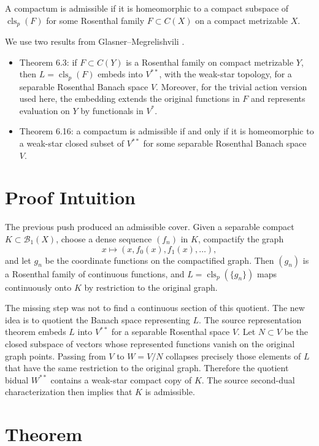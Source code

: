 \documentclass[11pt]{article}
\newcommand{\Baire}{\mathcal B_1}
\newcommand{\clp}{\operatorname{cls}_p}
\begin{document}
A compactum is admissible if it is homeomorphic to a compact subspace of
\(\clp(F)\) for some Rosenthal family \(F\subset C(X)\) on a compact
metrizable \(X\).

We use two results from Glasner--Megrelishvili \cite{GM0803}.

\begin{itemize}
  \item Theorem 6.3: if \(F\subset C(Y)\) is a Rosenthal family on compact
  metrizable \(Y\), then \(L=\clp(F)\) embeds into \(V^{**}\), with the
  weak-star topology, for a separable Rosenthal Banach space \(V\).  Moreover,
  for the trivial action version used here, the embedding extends the original
  functions in \(F\) and represents evaluation on \(Y\) by functionals in
  \(V^*\).
  \item Theorem 6.16: a compactum is admissible if and only if it is
  homeomorphic to a weak-star closed subset of \(V^{**}\) for some separable
  Rosenthal Banach space \(V\).
\end{itemize}

\section*{Proof Intuition}

The previous push produced an admissible cover.  Given a separable compact
\(K\subset\Baire(X)\), choose a dense sequence \((f_n)\) in \(K\), compactify
the graph
\[
  x\mapsto (x,f_0(x),f_1(x),\ldots),
\]
and let \(g_n\) be the coordinate functions on the compactified graph.  Then
\((g_n)\) is a Rosenthal family of continuous functions, and
\(L=\clp(\{g_n\})\) maps continuously onto \(K\) by restriction to the
original graph.

The missing step was not to find a continuous section of this quotient.  The
new idea is to quotient the Banach space representing \(L\).  The source
representation theorem embeds \(L\) into \(V^{**}\) for a separable Rosenthal
space \(V\).  Let \(N\subset V\) be the closed subspace of vectors whose
represented functions vanish on the original graph points.  Passing from
\(V\) to \(W=V/N\) collapses precisely those elements of \(L\) that have the
same restriction to the original graph.  Therefore the quotient bidual
\(W^{**}\) contains a weak-star compact copy of \(K\).  The source
second-dual characterization then implies that \(K\) is admissible.

\section*{Theorem}
\end{document}
